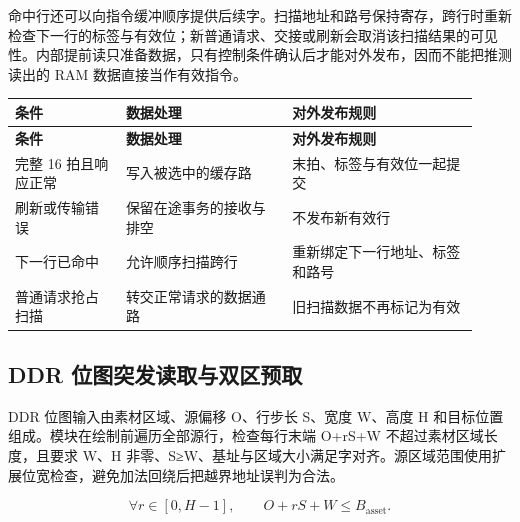 \documentclass[UTF8,a4paper,12pt]{ctexart}
\begin{document}
命中行还可以向指令缓冲顺序提供后续字。扫描地址和路号保持寄存，跨行时重新检查下一行的标签与有效位；新普通请求、交接或刷新会取消该扫描结果的可见性。内部提前读只准备数据，只有控制条件确认后才能对外发布，因而不能把推测读出的 RAM 数据直接当作有效指令。\par

{\small\setlength{\tabcolsep}{4pt}\renewcommand{\arraystretch}{1.2}

\begin{longtable}{>{\raggedright\arraybackslash}p{0.22\linewidth}>{\raggedright\arraybackslash}p{0.33\linewidth}>{\raggedright\arraybackslash}p{0.37\linewidth}}

\toprule

\textbf{条件} & \textbf{数据处理} & \textbf{对外发布规则} \\ \midrule

\endfirsthead

\toprule

\textbf{条件} & \textbf{数据处理} & \textbf{对外发布规则} \\ \midrule

\endhead

完整 16 拍且响应正常 & 写入被选中的缓存路 & 末拍、标签与有效位一起提交 \\

刷新或传输错误 & 保留在途事务的接收与排空 & 不发布新有效行 \\

下一行已命中 & 允许顺序扫描跨行 & 重新绑定下一行地址、标签和路号 \\

普通请求抢占扫描 & 转交正常请求的数据通路 & 旧扫描数据不再标记为有效 \\

\bottomrule

\end{longtable}

}

\subsection{DDR 位图突发读取与双区预取}

DDR 位图输入由素材区域、源偏移 O、行步长 S、宽度 W、高度 H 和目标位置组成。模块在绘制前遍历全部源行，检查每行末端 O+rS+W 不超过素材区域长度，且要求 W、H 非零、S≥W、基址与区域大小满足字对齐。源区域范围使用扩展位宽检查，避免加法回绕后把越界地址误判为合法。\par

\[
\forall r\in[0,H-1],\qquad O+rS+W\leq B_{\mathrm{asset}}.
\]
\end{document}

